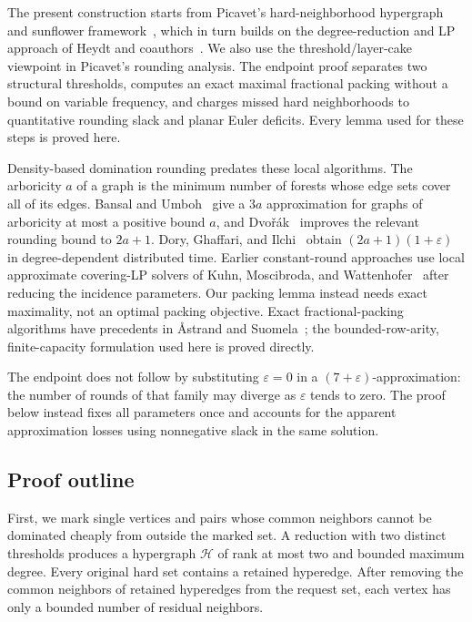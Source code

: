 \documentclass[11pt,a4paper]{article}
\theoremstyle{definition}
\theoremstyle{remark}
\newcommand{\HH}{\mathcal H}
\begin{document}
The present construction starts from Picavet's hard-neighborhood hypergraph
and sunflower framework~\cite{Picavet26,ER60}, which in turn builds on the
degree-reduction and LP approach of Heydt and coauthors~\cite{HSV22,HKSS25}.
We also use the threshold/layer-cake viewpoint in Picavet's rounding
analysis. The endpoint proof separates two structural thresholds, computes
an exact maximal fractional packing without a bound on variable frequency,
and charges missed hard neighborhoods to quantitative rounding slack and
planar Euler deficits. Every lemma used for these steps is proved here.

Density-based domination rounding predates these local algorithms.
The arboricity $a$ of a graph is the minimum number of forests whose
edge sets cover all of its edges.
Bansal and Umboh~\cite{BU17} give a $3a$ approximation for graphs of
arboricity at most a positive bound $a$,
and Dvo\v r\'ak~\cite{Dvorak19} improves the relevant rounding bound to
$2a+1$. Dory, Ghaffari, and Ilchi~\cite{DGI24} obtain
$(2a+1)(1+\varepsilon)$ in degree-dependent distributed time. Earlier
constant-round approaches use local approximate covering-LP solvers of
Kuhn, Moscibroda, and Wattenhofer~\cite{KMW06,KMW16} after reducing the
incidence parameters. Our packing lemma instead needs exact maximality,
not an optimal packing objective. Exact fractional-packing algorithms have
precedents in \AA strand and Suomela~\cite{AS10}; the bounded-row-arity,
finite-capacity formulation used here is proved directly.

The endpoint does not follow by substituting \(\varepsilon=0\) in a
\((7+\varepsilon)\)-approximation: the number of rounds of that family may
diverge as \(\varepsilon\) tends to zero. The proof below instead fixes all
parameters once and accounts for the apparent approximation losses using
nonnegative slack in the same solution.

\subsection{Proof outline}

First, we mark single vertices and pairs whose common neighbors cannot be
dominated cheaply from outside the marked set. A reduction with two distinct
thresholds produces a hypergraph \(\HH\) of rank at most two and bounded
maximum degree. Every original hard set contains a retained hyperedge.
After removing the common neighbors of retained hyperedges from the
request set, each vertex has only a bounded number of residual neighbors.
\end{document}
